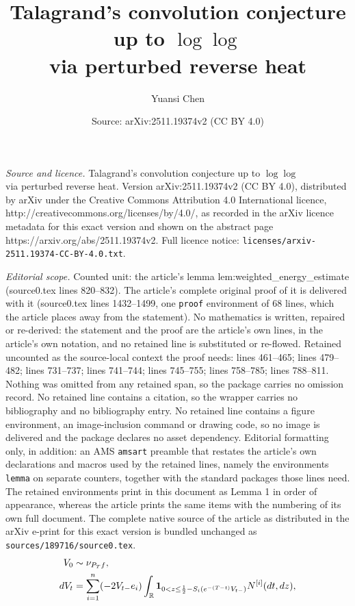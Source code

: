 \documentclass[10pt,a4paper]{amsart}
\title{Talagrand's convolution conjecture up to $\log \log$ \\ via perturbed reverse heat}
\author{Yuansi Chen}
\date{Source: arXiv:2511.19374v2 (CC BY 4.0)}
\newcommand{\real}{\ensuremath{\mathbb{R}}}
\newcommand{\tagi}{{[i]}}
\newcommand{\uV}{V}
\begin{document}
\maketitle

\noindent\emph{Source and licence.} Talagrand's convolution conjecture up to $\log \log$ \\ via perturbed reverse heat. Version arXiv:2511.19374v2 (CC BY 4.0), distributed by arXiv under the Creative Commons Attribution 4.0 International licence, http://creativecommons.org/licenses/by/4.0/, as recorded in the arXiv licence metadata for this exact version and shown on the abstract page https://arxiv.org/abs/2511.19374v2. Full licence notice: \texttt{licenses/arxiv-2511.19374-CC-BY-4.0.txt}.\par\smallskip

\noindent\textit{Editorial scope.} Counted unit: the article's lemma lem:weighted\_energy\_estimate (source0.tex lines 820--832). The article's complete original proof of it is delivered with it (source0.tex lines 1432--1499, one \texttt{proof} environment of 68 lines, which the article places away from the statement). No mathematics is written, repaired or re-derived: the statement and the proof are the article's own lines, in the article's own notation, and no retained line is substituted or re-flowed.  Retained uncounted as the source-local context the proof needs: lines 461--465; lines 479--482; lines 731--737; lines 741--744; lines 745--755; lines 758--785; lines 788--811.  Nothing was omitted from any retained span, so the package carries no omission record.  No retained line contains a citation, so the wrapper carries no bibliography and no bibliography entry.  No retained line contains a figure environment, an image-inclusion command or drawing code, so no image is delivered and the package declares no asset dependency.  Editorial formatting only, in addition: an AMS \texttt{amsart} preamble that restates the article's own declarations and macros used by the retained lines, namely the environments \texttt{lemma} on separate counters, together with the standard packages those lines need.  The retained environments print in this document as Lemma 1 in order of appearance, whereas the article prints the same items with the numbering of its own full document.  The complete native source of the article as distributed in the arXiv e-print for this exact version is bundled unchanged as \texttt{sources/189716/source0.tex}.
\begin{align}
  \label{eq:def_reverse_process}
  \uV_0 &\sim \nu_{P_T f}, \notag \\
  d \uV_t &=  \sum_{i=1}^n (-2 \uV_{t-} e_i) \int_\real \mathbf{1}_{0 < z \leq \frac12 - S_i(e^{-{(T-t)}} \uV_{t-})} N^\tagi(dt, dz),
\end{align}
\end{document}
